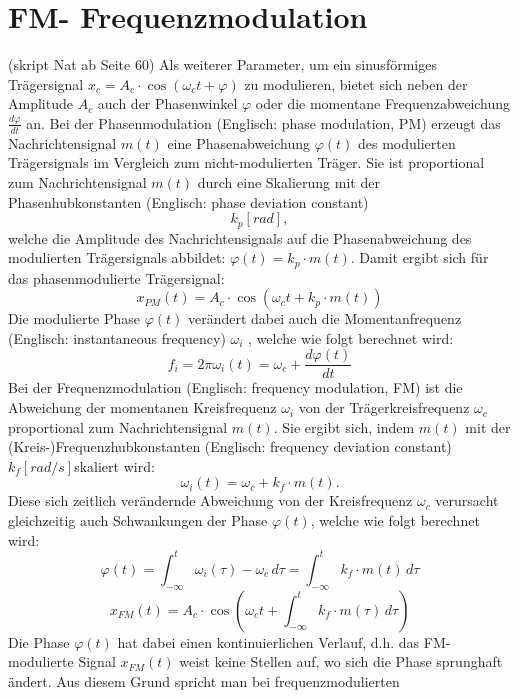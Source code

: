 %
%
%
\section{FM- Frequenzmodulation
\label{fm:section:teil1}}
(skript Nat ab Seite 60)
Als weiterer Parameter, um ein sinusförmiges Trägersignal \(x_c = A_c \cdot \cos(\omega_c t + \varphi)\) zu modulieren,
bietet sich neben der Amplitude \(A_c\) auch der Phasenwinkel \(\varphi\) oder die momentane Frequenzabweichung \(\frac{d\varphi}{dt}\) an.
Bei der Phasenmodulation (Englisch: phase modulation, PM) erzeugt das Nachrichtensignal \(m(t)\) eine Phasenabweichung \(\varphi(t)\)
des modulierten Trägersignals im Vergleich zum nicht-modulierten Träger.
Sie ist proportional zum Nachrichtensignal \(m(t)\) durch eine Skalierung mit der Phasenhubkonstanten (Englisch: phase deviation constant) 
\[
    k_p [rad],
\]
welche die Amplitude des Nachrichtensignals auf die Phasenabweichung des
modulierten Trägersignals abbildet: \(\varphi(t) = k_p \cdot m(t)\).
Damit ergibt sich für das phasenmodulierte Trägersignal:
\[
    x_{PM} (t) = A_c \cdot \cos (\omega_c t + k_p \cdot m(t))
\]
Die modulierte Phase \(\varphi(t)\) verändert dabei auch die Momentanfrequenz (Englisch: instantaneous frequency) \(\omega_i\)
, welche wie folgt berechnet wird:
\[
    f_i = 2\pi \omega_i (t) = \omega_c + \frac{d\varphi(t)}{dt}
\]
Bei der Frequenzmodulation (Englisch: frequency modulation, FM) ist die Abweichung der momentanen
Kreisfrequenz \(\omega_i\) von der Trägerkreisfrequenz \(\omega_c\) proportional zum Nachrichtensignal \(m(t)\).
Sie ergibt sich, indem \(m(t)\) mit der (Kreis-)Frequenzhubkonstanten (Englisch: frequency deviation constant) \(k_f [rad/s] \)skaliert wird: 
\[
    \omega_i (t) = \omega_c + k_f \cdot m(t).
\]
Diese sich zeitlich verändernde Abweichung von der Kreisfrequenz \(\omega_c\)
verursacht gleichzeitig auch Schwankungen der Phase \(\varphi(t)\),
welche wie folgt berechnet wird:
\[
    \varphi (t) =
    \int_{-\infty}^t \omega_i (\tau ) - \omega_c\, d\tau =
    \int_{-\infty}^t k_f \cdot m(t)\,d\tau
\]
\[
    x_{FM} (t) = A_c \cdot \cos \left( \omega_c t +  \int_{-\infty}^t k_f  \cdot m ( \tau) \,d\tau \right) 
\]
Die Phase \(\varphi(t)\) hat dabei einen kontinuierlichen Verlauf, d.h. das FM-modulierte Signal \(x_{FM}(t)\) weist keine Stellen auf,
 wo sich die Phase sprunghaft ändert. Aus diesem Grund spricht man bei frequenzmodulierten
